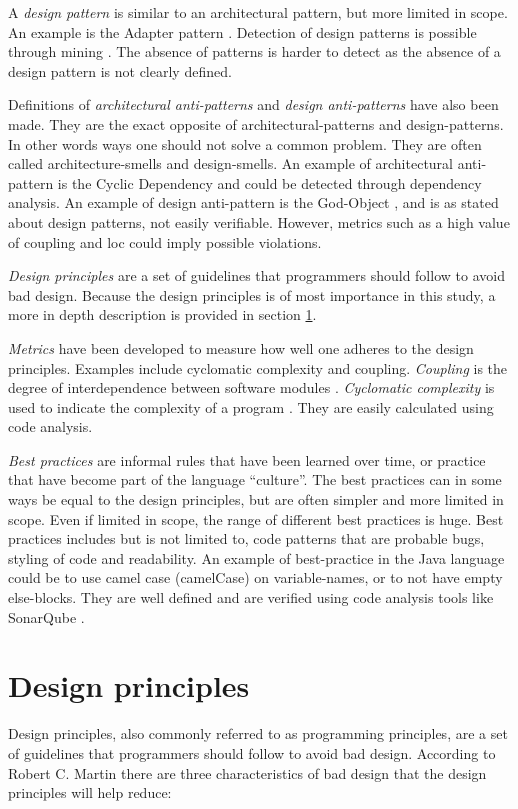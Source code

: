 \documentclass{report}
\begin{document}
A \textit{design pattern} is similar to an architectural pattern, but more limited in scope. An example is the Adapter pattern \cite{Adapterp54:online}. Detection of design patterns is possible through mining \cite{TEKIN2014406}. The absence of patterns is harder to detect as the absence of a design pattern is not clearly defined.

Definitions of \textit{architectural anti-patterns} and \textit{design anti-patterns} have also been made. They are the exact opposite of architectural-patterns and design-patterns. In other words ways one should not solve a common problem. They are often called architecture-smells and design-smells. An example of architectural anti-pattern is the Cyclic Dependency \cite{cyclicdependency} and could be detected through dependency analysis. An example of design anti-pattern is the God-Object \cite{Godobjec14:online}, and is as stated about design patterns, not easily verifiable. However, metrics such as a high value of coupling and \gls{loc} could imply possible violations.


\textit{Design principles} are a set of guidelines that programmers should follow to avoid bad design. Because the design principles is of most importance in this study, a more in depth description is provided in section \ref{design-principles}.

\textit{Metrics} have been developed to measure how well one adheres to the design principles. Examples include cyclomatic complexity and coupling. \textit{Coupling} is the degree of interdependence between software modules \cite{Coupling2:online}. \textit{Cyclomatic complexity} is used to indicate the complexity of a program \cite{Cyclomat54:online}. They are easily calculated using code analysis.

\textit{Best practices} are informal rules that have been learned over time, or practice that have become part of the language ``culture''. The best practices can in some ways be equal to the design principles, but are often simpler and more limited in scope. Even if limited in scope, the range of different best practices is huge. Best practices includes but is not limited to, code patterns that are probable bugs, styling of code and readability. An example of best-practice in the Java language could be to use camel case (camelCase) \cite{camelcase} on variable-names, or to not have empty else-blocks. They are well defined and are verified using code analysis tools like SonarQube \cite{sonarqube}.

\section{Design principles}
\label{design-principles}
Design principles, also commonly referred to as programming principles, are a set of guidelines that programmers should follow to avoid bad design. According to Robert C. Martin \cite{robertcmartinprinciples} there are three characteristics of bad design that the design principles will help reduce:
\end{document}
